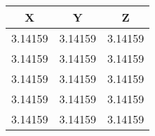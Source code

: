 \lipsum[8]

\vspace{-1.5ex}
\begin{center}
\setlength{\tabcolsep}{18pt}
\begin{tabular}{ccc}
\hline
X  & Y & Z \\
\hline
3.14159 & 3.14159 & 3.14159 \\
3.14159 & 3.14159 & 3.14159 \\
3.14159 & 3.14159 & 3.14159 \\
3.14159 & 3.14159 & 3.14159 \\
3.14159 & 3.14159 & 3.14159 \\
\hline
\end{tabular}
\label{table:tablelab}
\end{center}
